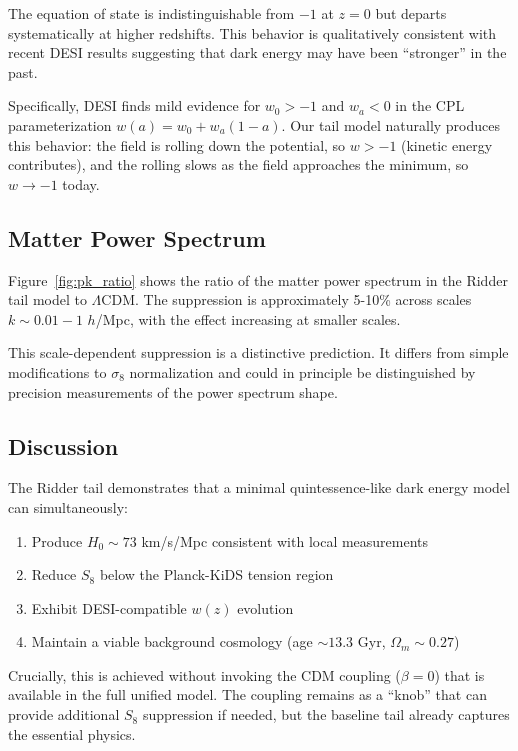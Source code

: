 The equation of state is indistinguishable from $-1$ at $z=0$ but departs systematically at higher redshifts. This behavior is qualitatively consistent with recent DESI results suggesting that dark energy may have been ``stronger'' in the past.

Specifically, DESI finds mild evidence for $w_0 > -1$ and $w_a < 0$ in the CPL parameterization $w(a) = w_0 + w_a(1-a)$. Our tail model naturally produces this behavior: the field is rolling down the potential, so $w > -1$ (kinetic energy contributes), and the rolling slows as the field approaches the minimum, so $w \to -1$ today.

\subsection{Matter Power Spectrum}

Figure~\ref{fig:pk_ratio} shows the ratio of the matter power spectrum in the Ridder tail model to $\Lambda$CDM. The suppression is approximately 5-10\% across scales $k \sim 0.01-1$ $h$/Mpc, with the effect increasing at smaller scales.

This scale-dependent suppression is a distinctive prediction. It differs from simple modifications to $\sigma_8$ normalization and could in principle be distinguished by precision measurements of the power spectrum shape.

\subsection{Discussion}

The Ridder tail demonstrates that a minimal quintessence-like dark energy model can simultaneously:
\begin{enumerate}
    \item Produce $H_0 \sim 73$ km/s/Mpc consistent with local measurements
    \item Reduce $S_8$ below the Planck-KiDS tension region
    \item Exhibit DESI-compatible $w(z)$ evolution
    \item Maintain a viable background cosmology (age $\sim 13.3$ Gyr, $\Omega_m \sim 0.27$)
\end{enumerate}

Crucially, this is achieved without invoking the CDM coupling ($\beta = 0$) that is available in the full unified model. The coupling remains as a ``knob'' that can provide additional $S_8$ suppression if needed, but the baseline tail already captures the essential physics.

